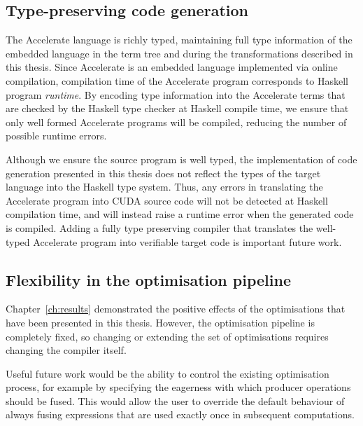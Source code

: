 \subsection{Type-preserving code generation}

The Accelerate language is richly typed, maintaining full type information of
the embedded language in the term tree and during the transformations described
in this thesis. Since Accelerate is an embedded language implemented via online
compilation, compilation time of the Accelerate program corresponds to Haskell
program \emph{runtime}. By encoding type information into the Accelerate terms
that are checked by the Haskell type checker at Haskell compile time, we ensure
that only well formed Accelerate programs will be compiled, reducing the number
of possible runtime errors.

Although we ensure the source program is well typed, the implementation of code
generation presented in this thesis does not reflect the types of the target
language into the Haskell type system. Thus, any errors in translating the
Accelerate program into CUDA source code will not be detected at Haskell
compilation time, and will instead raise a runtime error when the generated code
is compiled. Adding a fully type preserving compiler that translates the
well-typed Accelerate program into verifiable target code is important future
work.


\subsection{Flexibility in the optimisation pipeline}

Chapter~\ref{ch:results} demonstrated the positive effects of the optimisations
that have been presented in this thesis. However, the optimisation pipeline is
completely fixed, so changing or extending the set of optimisations requires
changing the compiler itself.

Useful future work would be the ability to control the existing optimisation
process, for example by specifying the eagerness with which producer operations
should be fused. This would allow the user to override the default behaviour of
always fusing expressions that are used exactly once in subsequent computations.

